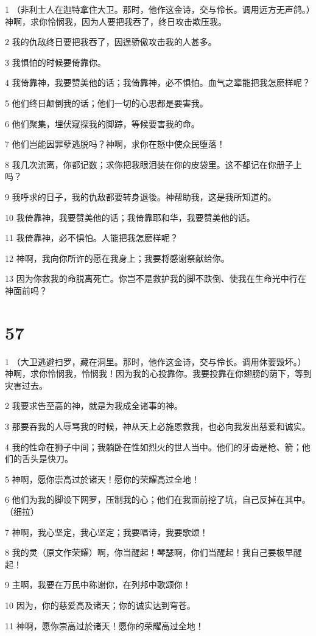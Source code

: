 \par 1 （非利士人在迦特拿住大卫。那时，他作这金诗，交与伶长。调用远方无声鸽。）神啊，求你怜悯我，因为人要把我吞了，终日攻击欺压我。
\par 2 我的仇敌终日要把我吞了，因逞骄傲攻击我的人甚多。
\par 3 我惧怕的时候要倚靠你。
\par 4 我倚靠神，我要赞美他的话；我倚靠神，必不惧怕。血气之辈能把我怎麽样呢？
\par 5 他们终日颠倒我的话；他们一切的心思都是要害我。
\par 6 他们聚集，埋伏窥探我的脚踪，等候要害我的命。
\par 7 他们岂能因罪孽逃脱吗？神啊，求你在怒中使众民堕落！
\par 8 我几次流离，你都记数；求你把我眼泪装在你的皮袋里。这不都记在你册子上吗？
\par 9 我呼求的日子，我的仇敌都要转身退後。神帮助我，这是我所知道的。
\par 10 我倚靠神，我要赞美他的话；我倚靠耶和华，我要赞美他的话。
\par 11 我倚靠神，必不惧怕。人能把我怎麽样呢？
\par 12 神啊，我向你所许的愿在我身上；我要将感谢祭献给你。
\par 13 因为你救我的命脱离死亡。你岂不是救护我的脚不跌倒、使我在生命光中行在神面前吗？

\chapter{57}

\par 1 （大卫逃避扫罗，藏在洞里。那时，他作这金诗，交与伶长。调用休要毁坏。）神啊，求你怜悯我，怜悯我！因为我的心投靠你。我要投靠在你翅膀的荫下，等到灾害过去。
\par 2 我要求告至高的神，就是为我成全诸事的神。
\par 3 那要吞我的人辱骂我的时候，神从天上必施恩救我，也必向我发出慈爱和诚实。
\par 4 我的性命在狮子中间；我躺卧在性如烈火的世人当中。他们的牙齿是枪、箭；他们的舌头是快刀。
\par 5 神啊，愿你崇高过於诸天！愿你的荣耀高过全地！
\par 6 他们为我的脚设下网罗，压制我的心；他们在我面前挖了坑，自己反掉在其中。（细拉）
\par 7 神啊，我心坚定，我心坚定；我要唱诗，我要歌颂！
\par 8 我的灵（原文作荣耀）啊，你当醒起！琴瑟啊，你们当醒起！我自己要极早醒起！
\par 9 主啊，我要在万民中称谢你，在列邦中歌颂你！
\par 10 因为，你的慈爱高及诸天；你的诚实达到穹苍。
\par 11 神啊，愿你崇高过於诸天！愿你的荣耀高过全地！

